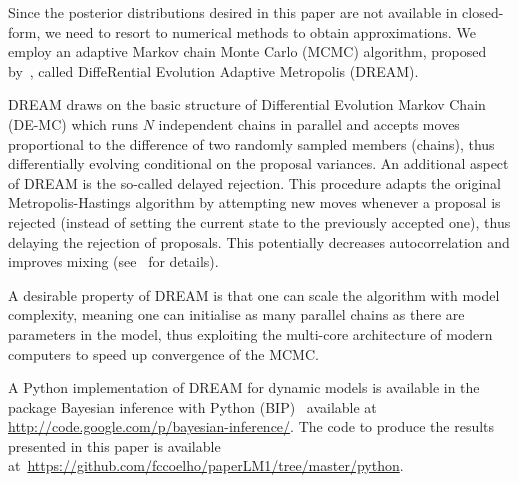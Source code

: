 \documentclass[10pt]{article}
\begin{document}
Since the posterior distributions desired in this paper are not available in 
closed-form, we need to resort to numerical methods to obtain 
approximations.
We employ an adaptive Markov chain Monte Carlo (MCMC) algorithm, proposed
by~\cite{vrugt2008}, called  DiffeRential Evolution Adaptive Metropolis (DREAM).

DREAM draws on the basic structure of Differential Evolution Markov Chain 
(DE-MC) which runs $N$ independent chains in parallel and accepts moves 
proportional to the difference of two randomly sampled members (chains), thus 
differentially evolving conditional on the proposal variances.
An additional aspect of DREAM is the so-called delayed rejection.
This procedure adapts the original Metropolis-Hastings algorithm by attempting 
new moves whenever a proposal is rejected (instead of setting the current state 
to the previously accepted one), thus delaying the rejection of proposals. 
This potentially decreases autocorrelation and improves mixing 
(see~\cite{mira2001} for details). 

A desirable property of DREAM is that one can scale the algorithm with model 
complexity, meaning one can initialise as many parallel chains as there are 
parameters in the model, thus exploiting the multi-core architecture of modern 
computers to speed up convergence of the MCMC.

A Python implementation of DREAM for dynamic models is available in the package 
Bayesian inference with Python (BIP)~\citep{pone2011} available at 
\url{http://code.google.com/p/bayesian-inference/}.
The code to produce the results presented in this paper is available 
at~\url{https://github.com/fccoelho/paperLM1/tree/master/python}.
\end{document}
